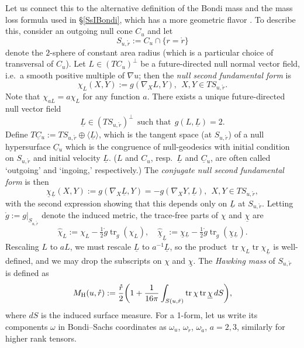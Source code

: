 \documentclass[reqno,11pt,letterpaper]{amsart}
\numberwithin{equation}{section}
\numberwithin{figure}{section}
\theoremstyle{definition}
\theoremstyle{remark}
\newcommand{\tr}{\operatorname{tr}}
\newcommand{\la}{\langle}
\newcommand{\ra}{\rangle}
\newcommand{\ul}[1]{\underline{#1}{}}
\newcommand{\half}{\tfrac{1}{2}}
\begin{document}
Let us connect this to the alternative definition of the Bondi mass and the mass loss formula used in \S\ref{SsIBondi}, which has a more geometric flavor \cite{ChristodoulouNonlinear}. To describe this, consider an outgoing null cone $C_u$ and let
\[
  S_{u,\mathring r}:=C_u\cap\{r=\mathring r\}
\]
denote the $2$-sphere of constant area radius (which is a particular choice of transversal of $C_u$). Let $L\in(T C_u)^\perp$ be a future-directed null normal vector field, i.e.\ a smooth positive multiple of $\nabla u$; then the \emph{null second fundamental form} is
\[
  \chi_L(X,Y) := g(\nabla_X L,Y),\ \ X,Y\in T S_{u,\mathring r}.
\]
Note that $\chi_{a L}=a\chi_L$ for any function $a$. There exists a unique future-directed null vector field
\begin{equation}
\label{EqLBSLbar}
  \ul L\in( T S_{u,\mathring r})^\perp\ \ \text{such that}\ \ g(L,\ul L)=2.
\end{equation}
Define $T\ul C_u:=T S_{u,\mathring r}\oplus\la\ul L\ra$, which is the tangent space (at $S_{u,\mathring r}$) of a null hypersurface $\ul C_u$ which is the congruence of null-geodesics with initial condition on $S_{u,\mathring r}$ and initial velocity $\ul L$. ($L$ and $C_u$, resp.\ $\ul L$ and $\ul C_u$, are often called `outgoing' and `ingoing,' respectively.) The \emph{conjugate null second fundamental form} is then
\[
  \ul\chi_{\ul L}(X,Y) := g(\nabla_X\ul L,Y)=-g(\nabla_X Y,\ul L),\ \ X,Y\in T S_{u,\mathring r},
\]
with the second expression showing that this depends only on $\ul L$ at $S_{u,\mathring r}$. Letting $\mathring g:=g|_{S_{u,\mathring r}}$ denote the induced metric, the trace-free parts of $\chi$ and $\ul\chi$ are
\[
  \hat\chi_L := \chi_L - \half\mathring g\tr_{\mathring g}(\chi_L), \quad
  \hat{\ul\chi}_{\ul L} := \ul\chi_{\ul L}-\half\mathring g\tr_{\mathring g}(\ul\chi_{\ul L}).
\]
Rescaling $L$ to $a L$, we must rescale $\ul L$ to $a^{-1}\ul L$, so the product $\tr\chi_L\tr\chi_{\ul L}$ is well-defined, and we may drop the subscripts on $\chi$ and $\ul\chi$. The \emph{Hawking mass} of $S_{u,\mathring r}$ is defined as
\begin{equation}
\label{EqLBSHawking}
  M_{\rm H}(u,\mathring r) := \frac{\mathring r}{2}\biggl(1+\frac{1}{16\pi}\int_{S(u,\mathring r)} \tr\chi \tr\ul\chi\,d S\biggr),
\end{equation}
where $d S$ is the induced surface measure. For a 1-form, let us write its components $\omega$ in Bondi--Sachs coordinates as $\omega_u$, $\omega_{\mathring r}$, $\omega_{\mathring a}$, $a=2,3$, similarly for higher rank tensors.
\end{document}
